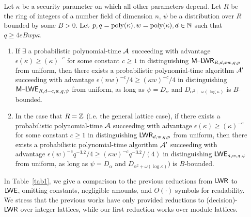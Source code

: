 \begin{theorem}\label{thm:main-thm}Let $\kappa$ be a security
  parameter on which all other parameters depend. Let $R$ be the ring
  of integers of a number field of dimension $n$, $\psi$ be a
  distribution over $R$ bounded by some $B >0$. Let
  $p, q = \operatorname{poly}(\kappa), w=\operatorname{poly}(\kappa),d \in \mathbb{N}$ such that
  $q \geq 4eBwp\kappa$.  

\begin{enumerate}
\item If $\exists$ a probabilistic
  polynomial-time $\mathcal{A}$ succeeding with advantage
  $\epsilon(\kappa) \geq (\kappa)^{-c}$ for some constant $c \geq 1$
  in distinguishing $\mathsf{M \text{\textendash} LWR}_{R,d,xw,q,p}$ from uniform, then there exists a
  probabilistic polynomial-time algorithm $\mathcal{A}'$ succeeding with advantage
  $\epsilon(nw)^{-c}/4 \geq (\kappa w)^{-c}/4$ in distinguishing
  $\mathsf{M \text{\textendash} LWE}_{R,d-c,w,q,\psi}$ from uniform, as long as $\psi=D_{\alpha}$
  and $D_{\alpha^2+\omega(\log{\kappa})}$  is $B$-bounded.
\item In the case that $R=\mathbb{Z}$ (i.e. the general lattice
  case), if there exists a probabilistic polynomial-time $\mathcal{A}$
  succeeding with advantage $\epsilon(\kappa) \geq (\kappa)^{-c}$ for
  some constant $c \geq 1$ in distinguishing $\mathsf{LWR}_{d,w,q,p}$ from
  uniform, then there exists a probabilistic polynomial-time algorithm
  $\mathcal{A}'$ succeeding with advantage
  $\epsilon(w)^{-c}q^{-3.2}/4 \geq (\kappa w)^{-c}q^{-3.2}/(4)$ in
  distinguishing $\mathsf{LWE}_{d,w,q,\psi}$ from uniform, as long as
  $\psi=D_{\alpha}$ and $D_{\alpha^2+\omega(\log{\kappa})})$ is
  $B$-bounded.
\end{enumerate}
\end{theorem}

In Table~\ref{tab1}, we give a comparison to the previous reductions
from $\mathsf{LWR}$ to $\mathsf{LWE}$, omitting
constants, negligible amounts, and $O(\cdot)$ symbols for
readability. We stress that the previous works have only provided reductions
to (decision)-$\mathsf{LWR}$ over integer lattices, while our first reduction
works over module lattices. 

